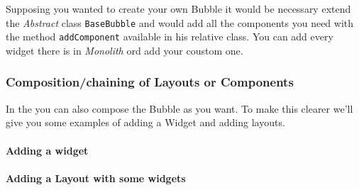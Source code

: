 Supposing you wanted to create your own Bubble it would be necessary extend the \textit{Abstract} class \texttt{BaseBubble} and would add all the components you need with the method \texttt{addComponent} available in his relative class. You can add every widget there is in \textit{Monolith} ord add your coustom one.




\subsubsection{Composition/chaining of Layouts or Components}

In the  you can also compose the Bubble as you want. To make this clearer we'll give you some examples of adding a Widget and adding layouts.

\paragraph{Adding a widget}


\paragraph{Adding a Layout with some widgets}

